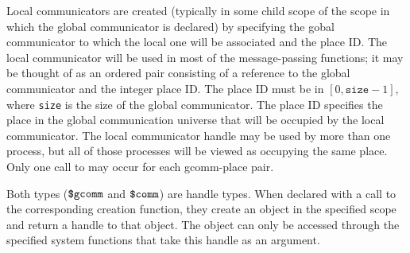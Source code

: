 Local communicators are created (typically in some child scope of the
scope in which the global communicator is declared) by specifying the
gobal communicator to which the local one will be associated and the
place ID. The local communicator will be used in most of the
message-passing functions; it may be thought of as an ordered pair
consisting of a reference to the global communicator and the integer
place ID.  The place ID must be in $[0,\texttt{size}-1]$, where
\texttt{size} is the size of the global communicator.  The place ID
specifies the place in the global communication universe that will be
occupied by the local communicator.  The local communicator handle may
be used by more than one process, but all of those processes will be
viewed as occupying the same place.  Only one call to \ccommcreate{}
may occur for each gcomm-place pair.


Both types ($\mbox{\texttt{\${}gcomm}}$ and $\mbox{\texttt{\${}comm}}$) are handle types. When declared
with a call to the corresponding creation function, they create an
object in the specified scope and return a handle to that object. The
object can only be accessed through the specified system functions
that take this handle as an argument.


